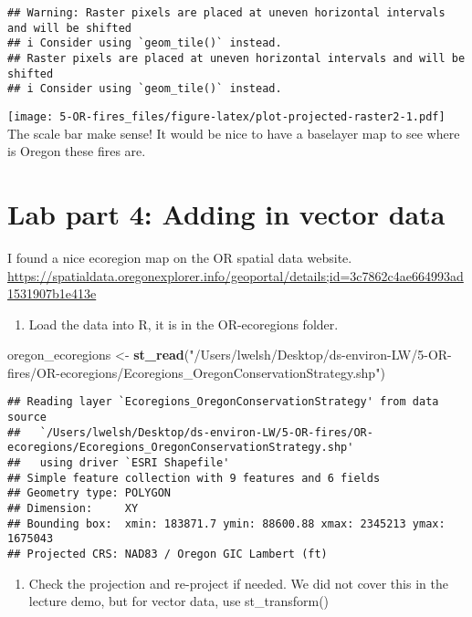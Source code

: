 \documentclass[
]{article}
\newenvironment{Shaded}{\begin{snugshade}}{\end{snugshade}}
\newcommand{\FunctionTok}[1]{\textcolor[rgb]{0.13,0.29,0.53}{\textbf{#1}}}
\newcommand{\NormalTok}[1]{#1}
\newcommand{\OtherTok}[1]{\textcolor[rgb]{0.56,0.35,0.01}{#1}}
\newcommand{\StringTok}[1]{\textcolor[rgb]{0.31,0.60,0.02}{#1}}
\providecommand{\tightlist}{%
  \setlength{\itemsep}{0pt}\setlength{\parskip}{0pt}}
\begin{document}
\begin{verbatim}
## Warning: Raster pixels are placed at uneven horizontal intervals and will be shifted
## i Consider using `geom_tile()` instead.
## Raster pixels are placed at uneven horizontal intervals and will be shifted
## i Consider using `geom_tile()` instead.
\end{verbatim}

\texttt{[image: 5-OR-fires\_files/figure-latex/plot-projected-raster2-1.pdf]}
The scale bar make sense! It would be nice to have a baselayer map to
see where is Oregon these fires are.

\hypertarget{lab-part-4-adding-in-vector-data}{%
\section{Lab part 4: Adding in vector
data}\label{lab-part-4-adding-in-vector-data}}

I found a nice ecoregion map on the OR spatial data website.
\url{https://spatialdata.oregonexplorer.info/geoportal/details;id=3c7862c4ae664993ad1531907b1e413e}

\begin{enumerate}
\def\labelenumi{\alph{enumi}.}
\tightlist
\item
  Load the data into R, it is in the OR-ecoregions folder.
\end{enumerate}

\begin{Shaded}
\begin{Highlighting}[]
\NormalTok{oregon\_ecoregions }\OtherTok{\textless{}{-}} \FunctionTok{st\_read}\NormalTok{(}\StringTok{"/Users/lwelsh/Desktop/ds{-}environ{-}LW/5{-}OR{-}fires/OR{-}ecoregions/Ecoregions\_OregonConservationStrategy.shp"}\NormalTok{)}
\end{Highlighting}
\end{Shaded}

\begin{verbatim}
## Reading layer `Ecoregions_OregonConservationStrategy' from data source 
##   `/Users/lwelsh/Desktop/ds-environ-LW/5-OR-fires/OR-ecoregions/Ecoregions_OregonConservationStrategy.shp' 
##   using driver `ESRI Shapefile'
## Simple feature collection with 9 features and 6 fields
## Geometry type: POLYGON
## Dimension:     XY
## Bounding box:  xmin: 183871.7 ymin: 88600.88 xmax: 2345213 ymax: 1675043
## Projected CRS: NAD83 / Oregon GIC Lambert (ft)
\end{verbatim}

\begin{enumerate}
\def\labelenumi{\alph{enumi}.}
\setcounter{enumi}{1}
\tightlist
\item
  Check the projection and re-project if needed. We did not cover this
  in the lecture demo, but for vector data, use st\_transform()
\end{enumerate}
\end{document}
